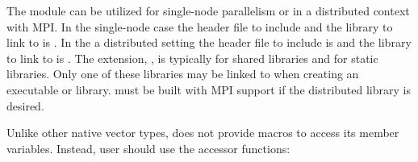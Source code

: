 The {\nveccuda} module can be utilized for single-node parallelism or in a
distributed context with MPI. In the single-node case the header file to
include  and the library to link to is
. In the a distributed setting the header
file to include is  and the library to link to is
. The extension, , is
typically  for shared libraries and  for static libraries.
Only one of these libraries may be linked to when creating an executable
or library. {\sundials} must be built with MPI support if the distributed
library is desired. 

Unlike other native {\sundials} vector types, {\nveccuda} does not provide macros
to access its member variables. Instead, user should use the accessor functions:

